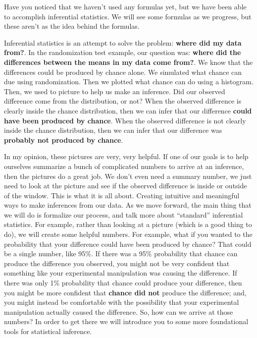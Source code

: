 \documentclass[
  letterpaper,
  DIV=11,
  numbers=noendperiod]{scrreprt}
\begin{document}
Have you noticed that we haven't used any formulas yet, but we have been
able to accomplish inferential statistics. We will see some formulas as
we progress, but these aren't as the idea behind the formulas.

Inferential statistics is an attempt to solve the problem: \textbf{where
did my data from?}. In the randomization test example, our question was:
\textbf{where did the differences between the means in my data come
from?}. We know that the differences could be produced by chance alone.
We simulated what chance can due using randomization. Then we plotted
what chance can do using a histogram. Then, we used to picture to help
us make an inference. Did our observed difference come from the
distribution, or not? When the observed difference is clearly inside the
chance distribution, then we can infer that our difference \textbf{could
have been produced by chance}. When the observed difference is not
clearly inside the chance distribution, then we can infer that our
difference was \textbf{probably not produced by chance}.

In my opinion, these pictures are very, very helpful. If one of our
goals is to help ourselves summarize a bunch of complicated numbers to
arrive at an inference, then the pictures do a great job. We don't even
need a summary number, we just need to look at the picture and see if
the observed difference is inside or outside of the window. This is what
it is all about. Creating intuitive and meaningful ways to make
inferences from our data. As we move forward, the main thing that we
will do is formalize our process, and talk more about ``standard''
inferential statistics. For example, rather than looking at a picture
(which is a good thing to do), we will create some helpful numbers. For
example, what if you wanted to the probability that your difference
could have been produced by chance? That could be a single number, like
95\%. If there was a 95\% probability that chance can produce the
difference you observed, you might not be very confident that something
like your experimental manipulation was causing the difference. If there
was only 1\% probability that chance could produce your difference, then
you might be more confident that \textbf{chance did not} produce the
difference; and, you might instead be comfortable with the possibility
that your experimental manipulation actually caused the difference. So,
how can we arrive at those numbers? In order to get there we will
introduce you to some more foundational tools for statistical inference.
\end{document}
